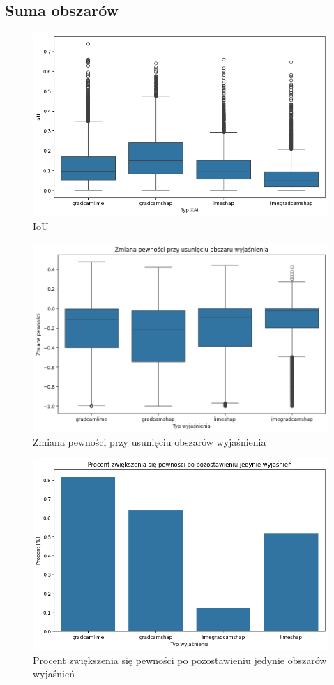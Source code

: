 \subsection*{Suma obszarów}
\begin{figure}
	\centering\includegraphics[width=.6\textwidth]{img/combine_iou_and}
	\caption{IoU}  \label{rys:combine_iou_and}
\end{figure}
\begin{figure}
	\centering\includegraphics[width=.6\textwidth]{img/combine_confidence_mask_and}
	\caption{Zmiana pewności przy usunięciu obszarów wyjaśnienia}  \label{rys:combine_confidence_mask_and}
\end{figure}
\begin{figure}
	\centering\includegraphics[width=.6\textwidth]{img/combine_confidence_womask_and}
	\caption{Procent zwiększenia się pewności po pozostawieniu jedynie obszarów wyjaśnień}  \label{rys:combine_confidence_womask_and}
\end{figure}

